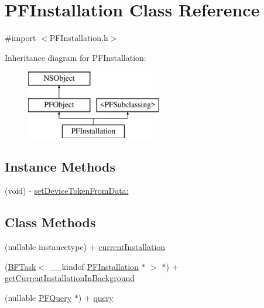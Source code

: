 \hypertarget{interface_p_f_installation}{}\section{P\+F\+Installation Class Reference}
\label{interface_p_f_installation}


{\ttfamily \#import $<$P\+F\+Installation.\+h$>$}

Inheritance diagram for P\+F\+Installation\+:\begin{figure}[H]
\begin{center}
\leavevmode
\includegraphics[height=3.000000cm]{interface_p_f_installation}
\end{center}
\end{figure}
\subsection*{Instance Methods}
\begin{DoxyCompactItemize}
\item 
(void) -\/ \hyperlink{interface_p_f_installation_aa80761aecdfdb358702f10a6f1b2f70d}{set\+Device\+Token\+From\+Data\+:}
\end{DoxyCompactItemize}
\subsection*{Class Methods}
\begin{DoxyCompactItemize}
\item 
(nullable instancetype) + \hyperlink{interface_p_f_installation_acbfae927713dd2e2ea1d8bf164074893}{current\+Installation}
\begin{DoxyCompactList}\small\item\em 

 \end{DoxyCompactList}\item 
(\hyperlink{class_b_f_task}{B\+F\+Task}$<$ \+\_\+\+\_\+kindof \hyperlink{interface_p_f_installation}{P\+F\+Installation} $\ast$ $>$ $\ast$) + \hyperlink{interface_p_f_installation_a702bcd03f3cecb6be3a91c37f3e63212}{get\+Current\+Installation\+In\+Background}
\item 
(nullable \hyperlink{class_p_f_query}{P\+F\+Query} $\ast$) + \hyperlink{interface_p_f_installation_a100d82347b3492642b9fdb64c880c884}{query}
\begin{DoxyCompactList}\small\item\em 

 \end{DoxyCompactList}\end{DoxyCompactItemize}
